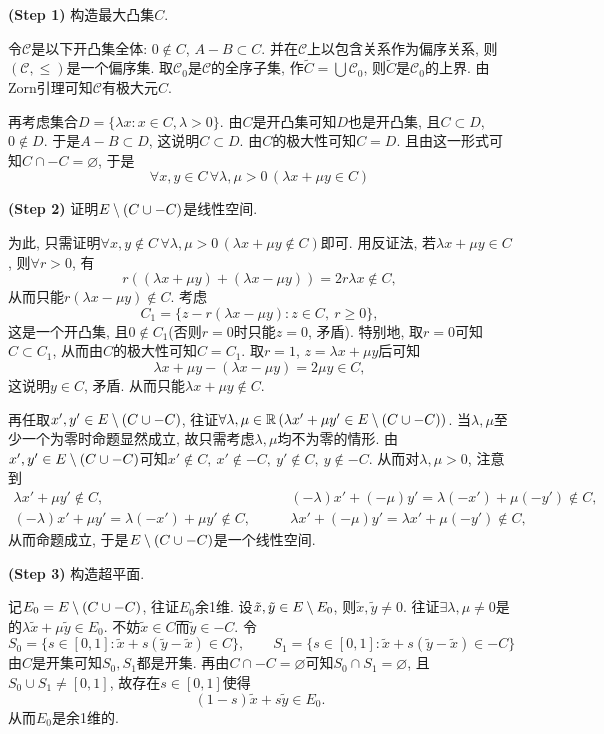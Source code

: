 	\textbf{(Step 1)} 构造最大凸集$ C $.
	
	令$ \mathcal{C} $是以下开凸集全体: $ 0\notin C $, $ A-B\subset C $. 并在$ \mathcal C $上以包含关系作为偏序关系, 则$ (\mathcal C,\leqslant) $是一个偏序集. 取$ \mathcal C_0 $是$ \mathcal C $的全序子集, 作$ \tilde{C}=\bigcup\mathcal C_0 $, 则$ \tilde{C} $是$ \mathcal C_0 $的上界. 由Zorn引理可知$ \mathcal C $有极大元$ C $.
	
	再考虑集合$ D=\{\lambda x : x\in C,\lambda>0\} $. 由$ C $是开凸集可知$ D $也是开凸集, 且$ C\subset D $, $ 0\notin D $. 于是$ A-B\subset D $, 这说明$ C\subset D $. 由$ C $的极大性可知$ C=D $. 且由这一形式可知$ C\cap -C=\varnothing $, 于是
	\[
	\forall x,y\in C\,\forall\lambda,\mu>0\,(\lambda x+\mu y\in C)
	\]
	
	\textbf{(Step 2)} 证明$ E\setminus(C\cup-C) $是线性空间.
	
	为此, 只需证明$ \forall x,y\notin C\,\forall\lambda,\mu>0\,(\lambda x+\mu y\notin C) $即可. 用反证法, 若$ \lambda x+\mu y\in C $, 则$ \forall r>0 $, 有
	\[
	r((\lambda x+\mu y)+(\lambda x-\mu y))=2r\lambda x\notin C,
	\]
	从而只能$ r(\lambda x-\mu y)\notin C $. 考虑
	\[
	C_1=\{ z-r(\lambda x-\mu y) : z\in C,\ r\geqslant 0 \},
	\]
	这是一个开凸集, 且$ 0\notin C_1 $(否则$ r=0 $时只能$ z=0 $, 矛盾). 特别地, 取$ r=0 $可知$ C\subset C_1 $, 从而由$ C $的极大性可知$ C=C_1 $. 取$ r=1 $, $ z=\lambda x+\mu y $后可知
	\[
	\lambda x+\mu y-(\lambda x-\mu y)=2\mu y\in C,
	\]
	这说明$ y\in C $, 矛盾. 从而只能$ \lambda x+\mu y\notin C $.
	
	再任取$ x', y'\in E\setminus(C\cup-C) $, 往证$ \forall\lambda,\mu\in\mathbb{R}\,(\lambda x'+\mu y'\in E\setminus(C\cup -C)) $. 当$ \lambda,\mu $至少一个为零时命题显然成立, 故只需考虑$ \lambda,\mu $均不为零的情形. 由$ x',y'\in E\setminus(C\cup-C) $可知$ x'\notin C,\ x'\notin -C,\ y'\notin C,\ y\notin -C $. 从而对$ \lambda,\mu>0 $, 注意到
	\[
	\begin{aligned}
	\lambda x'+\mu y'\notin C,&\qquad (-\lambda)x'+(-\mu)y'=\lambda(-x')+\mu(-y')\notin C,\\
	(-\lambda)x'+\mu y'=\lambda(-x')+\mu y'\notin C,&\qquad \lambda x'+(-\mu)y'=\lambda x'+\mu(-y')\notin C,
	\end{aligned}
	\]
	从而命题成立, 于是$ E\setminus(C\cup-C) $是一个线性空间.
	
	\textbf{(Step 3)} 构造超平面.
	
	记$ E_0=E\setminus(C\cup-C) $, 往证$ E_0 $余1维. 设$ \tilde{x},\tilde{y}\in E\setminus E_0 $, 则$ \tilde{x},\tilde{y}\ne 0 $. 往证$ \exists \lambda,\mu\ne 0 $是的$ \lambda\tilde{x}+\mu\tilde{y}\in E_0 $. 不妨$ \tilde{x}\in C $而$ \tilde{y}\in -C $. 令
	\[
	S_0=\{ s\in[0,1] : \tilde{x}+s(\tilde{y}-\tilde{x})\in C \},\qquad S_1=\{ s\in[0,1] : \tilde{x}+s(\tilde{y}-\tilde{x})\in -C \}
	\]
	由$ C $是开集可知$ S_0, S_1 $都是开集. 再由$ C\cap -C=\varnothing $可知$ S_0\cap S_1=\varnothing $, 且$ S_0\cup S_1\ne[0,1] $, 故存在$ s\in[0,1] $使得
	\[
	(1-s)\tilde{x}+s\tilde{y}\in E_0.
	\]
	从而$ E_0 $是余1维的.
	

